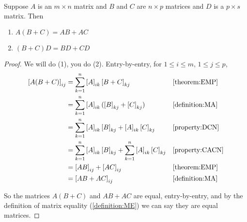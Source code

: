\documentclass{ximera}
\begin{document}
\begin{theorem}
  \label{theorem:MMDAA}

  Suppose $A$ is an $m\times n$ matrix and $B$ and $C$ are $n\times p$ matrices and $D$ is a $p\times s$ matrix.    Then
\begin{enumerate}
\item $A(B+C)=AB+AC$
\item $(B+C)D=BD+CD$
\end{enumerate}

\begin{proof}
  We will do (1), you do (2).  Entry-by-entry, for $1\leq i\leq m$, $1\leq j\leq p$,
  \begin{align*}
    \left\lbrack A(B+C)\right\rbrack_{ij}
    &=
      \sum_{k=1}^{n}\left\lbrack A\right\rbrack_{ik}\left\lbrack B+C\right\rbrack_{kj}&&\ref{theorem:EMP}\\
    &=\sum_{k=1}^{n}\left\lbrack A\right\rbrack_{ik}(\left\lbrack B\right\rbrack_{kj}+\left\lbrack C\right\rbrack_{kj})&&\ref{definition:MA}\\
    &=\sum_{k=1}^{n}\left\lbrack A\right\rbrack_{ik}\left\lbrack B\right\rbrack_{kj}+\left\lbrack A\right\rbrack_{ik}\left\lbrack C\right\rbrack_{kj}
                                                            &&\ref{property:DCN}\\
    &=\sum_{k=1}^{n}\left\lbrack A\right\rbrack_{ik}\left\lbrack B\right\rbrack_{kj}+\sum_{k=1}^{n}\left\lbrack A\right\rbrack_{ik}\left\lbrack C\right\rbrack_{kj}&&\ref{property:CACN}\\
    &=\left\lbrack AB\right\rbrack_{ij}+\left\lbrack AC\right\rbrack_{ij}&&\ref{theorem:EMP}\\
    &=\left\lbrack AB+AC\right\rbrack_{ij}&&\ref{definition:MA}
  \end{align*}

  So the matrices $A(B+C)$ and $AB+AC$ are equal, entry-by-entry, and by the definition of matrix equality (\ref{definition:ME}) we can say they are equal matrices.

\end{proof}
\end{theorem}
\end{document}

